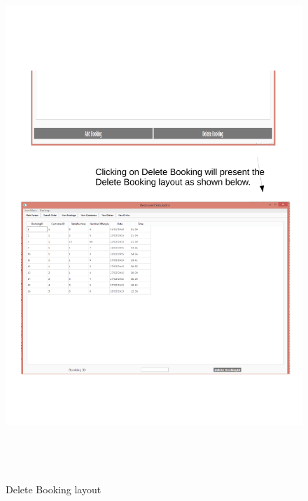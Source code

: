 \begin{figure}[H]
    \includegraphics[height = 20cm]{./Testing/images/test3.pdf}
    \caption{Delete Booking layout} \label{fig:Test3}
\end{figure}

